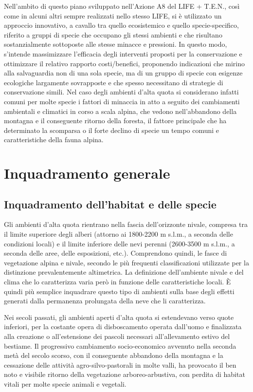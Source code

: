 \documentclass[10pt,twoside,openany,x11names,svgnames,italian,a5paper,dvipsnames,table]{memoir}
\newcommand\chapterillustration{}
\begin{document}
Nell'ambito di questo piano sviluppato nell'Azione A8 del LIFE + T.E.N., così come in alcuni altri sempre realizzati nello stesso LIFE, si è utilizzato un approccio innovativo, a cavallo tra quello ecosistemico e quello specie-specifico, riferito a gruppi di specie che occupano gli stessi ambienti e che risultano sostanzialmente sottoposte alle stesse minacce e pressioni. In questo modo, s’intende massimizzare l'efficacia degli interventi proposti per la conservazione e ottimizzare il relativo rapporto costi/benefici, proponendo indicazioni che mirino alla salvaguardia non di una sola specie, ma di un gruppo di specie con esigenze ecologiche largamente sovrapposte e che spesso necessitano di strategie di conservazione simili. Nel caso degli ambienti d’alta quota si considerano infatti comuni per molte specie i fattori di minaccia in atto a seguito dei cambiamenti ambientali e climatici in corso a scala alpina, che vedono nell’abbandono della montagna e il conseguente ritorno della foresta, il fattore principale che ha determinato la scomparsa o il forte declino di specie un tempo comuni e caratteristiche della fauna alpina. \\




\normalsize
\setlength\afterchapskip{52mm}
\chapter{Inquadramento generale}
\renewcommand\chapterillustration{1.JPG}

\section{Inquadramento dell'habitat e delle specie}
Gli ambienti d’alta quota rientrano nella fascia dell’orizzonte nivale, compresa tra il limite superiore degli alberi (attorno ai 1800-2200 m s.l.m., a seconda delle condizioni locali) e il limite inferiore delle nevi perenni (2600-3500 m s.l.m., a seconda delle aree, delle esposizioni, etc.). Comprendono quindi, le fasce di vegetazione alpina e nivale, secondo le più frequenti classificazioni utilizzate per la distinzione prevalentemente altimetrica. La definizione dell’ambiente nivale e del clima che lo caratterizza varia però in funzione delle caratteristiche locali. È quindi più semplice inquadrare questo tipo di ambienti sulla base degli effetti generati dalla permanenza prolungata della neve che li caratterizza. 

Nei secoli passati, gli ambienti aperti d’alta quota si estendevano verso quote inferiori, per la costante opera di disboscamento operata dall’uomo e finalizzata alla creazione o all’estensione dei pascoli necessari all’allevamento estivo del bestiame. Il progressivo cambiamento socio-economico avvenuto nella seconda metà del secolo scorso, con il conseguente abbandono della montagna e la  cessazione delle attività agro-silvo-pastorali in molte valli, ha provocato il ben noto e visibile ritorno della vegetazione arboreo-arbustiva, con perdita di habitat vitali per molte specie animali e vegetali.
\end{document}
